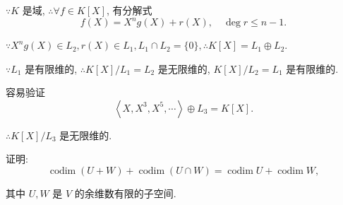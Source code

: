 \documentclass{ctexart}
\begin{document}
\begin{solution}
    $\because K$ 是域, $\therefore\forall f\in K[X]$, 有分解式
    \[f(X)=X^ng(X)+r(X),\quad\deg r\leq n-1.\]

    $\because X^ng(X)\in L_2,r(X)\in L_1,L_1\cap L_2=\{0\},\therefore K[X]=L_1\oplus L_2$.

    $\because L_1$ 是有限维的, $\therefore K[X]/L_1=L_2$ 是无限维的, $K[X]/L_2=L_1$ 是有限维的.

    容易验证
    \[\left<X,X^3,X^5,\cdots\right>\oplus L_3=K[X].\]

    $\therefore K[X]/L_3$ 是无限维的.
\end{solution}
\begin{exercise}%
    证明:
    \[\operatorname{codim}(U+W)+\operatorname{codim}(U\cap W)=\operatorname{codim}U+\operatorname{codim}W,\]

    其中 $U,W$ 是 $V$ 的余维数有限的子空间.
\end{exercise}
\end{document}
